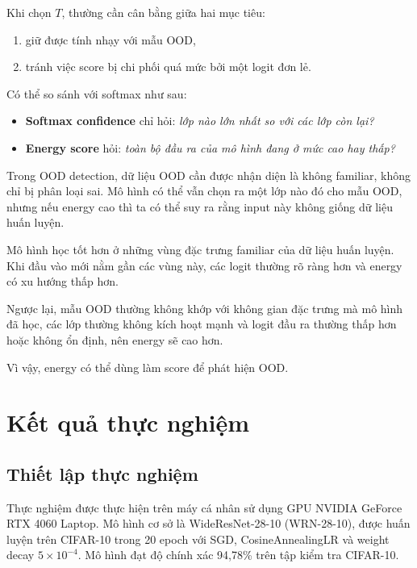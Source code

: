 \documentclass[12pt,a4paper]{article}
\begin{document}
Khi chọn $T$, thường cần cân bằng giữa hai mục tiêu:
\begin{enumerate}
  \item giữ được tính nhạy với mẫu OOD,
  \item tránh việc score bị chi phối quá mức bởi một logit đơn lẻ.
\end{enumerate}

Có thể so sánh với softmax như sau:

\begin{itemize}
  \item \textbf{Softmax confidence} chỉ hỏi: \emph{lớp nào lớn nhất so với các lớp còn lại?}
  \item \textbf{Energy score} hỏi: \emph{toàn bộ đầu ra của mô hình đang ở mức cao hay thấp?}
\end{itemize}

Trong OOD detection, dữ liệu OOD cần được nhận diện là không familiar, không chỉ bị phân loại sai. Mô hình có thể vẫn chọn ra một lớp nào đó cho mẫu OOD, nhưng nếu energy cao thì ta có thể suy ra rằng input này không giống dữ liệu huấn luyện.

Mô hình học tốt hơn ở những vùng đặc trưng familiar của dữ liệu huấn luyện. Khi đầu vào mới nằm gần các vùng này, các logit thường rõ ràng hơn và energy có xu hướng thấp hơn.

Ngược lại, mẫu OOD thường không khớp với không gian đặc trưng mà mô hình đã học, các lớp thường không kích hoạt mạnh và logit đầu ra thường thấp hơn hoặc không ổn định, nên energy sẽ cao hơn.

Vì vậy, energy có thể dùng làm score để phát hiện OOD.

\section{Kết quả thực nghiệm}

\subsection{Thiết lập thực nghiệm}

Thực nghiệm được thực hiện trên máy cá nhân sử dụng GPU NVIDIA GeForce RTX 4060 Laptop. Mô hình cơ sở là WideResNet-28-10 (WRN-28-10), được huấn luyện trên CIFAR-10 trong 20 epoch với SGD, CosineAnnealingLR và weight decay $5{\times}10^{-4}$. Mô hình đạt độ chính xác 94,78\% trên tập kiểm tra CIFAR-10.
\end{document}
